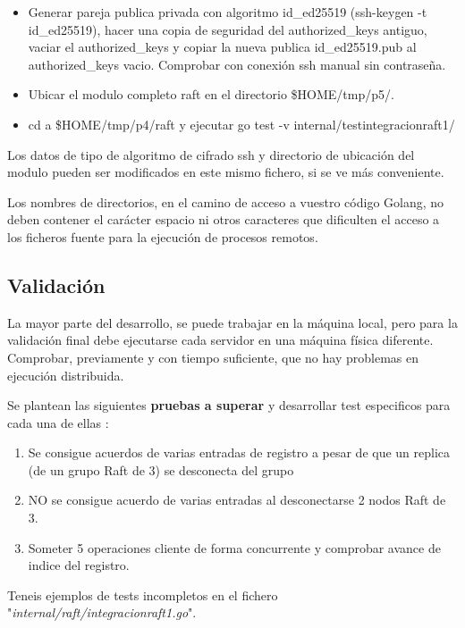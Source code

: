 \documentclass{unizarpractice}
\begin{document}
\begin{itemize}[topsep=-0.5\baselineskip]
	\item Generar pareja publica privada con algoritmo id\_ed25519 (ssh-keygen -t id\_ed25519), hacer una copia de seguridad del authorized\_keys antiguo, vaciar el authorized\_keys y copiar la nueva publica id\_ed25519.pub al authorized\_keys vacio. Comprobar con conexión ssh manual sin contraseña.
	\item Ubicar el modulo completo raft en el directorio \$HOME/tmp/p5/.
	\item cd a \$HOME/tmp/p4/raft y ejecutar go test -v internal/testintegracionraft1/	
\end{itemize}

Los datos de tipo de algoritmo de cifrado ssh y directorio de ubicación del modulo pueden ser modificados en este mismo fichero, si se ve más conveniente.

Los nombres de directorios, en el camino de acceso a vuestro código Golang, no deben contener el carácter espacio ni otros caracteres que dificulten el acceso a los ficheros fuente para la ejecución de procesos remotos.


\subsection{Validación}
La mayor parte del desarrollo, se puede trabajar en la máquina local, pero para la validación final debe ejecutarse cada servidor en una máquina física diferente. Comprobar, previamente y con tiempo suficiente, que no hay problemas en ejecución distribuida.

\noindent Se plantean las siguientes \textbf{pruebas a superar} y desarrollar test especificos para cada una de ellas :

\begin{enumerate}[topsep=-0.5\baselineskip]
\item Se consigue acuerdos de varias entradas de registro	a pesar de que un replica (de un grupo Raft de 3) se desconecta del grupo
\item NO se consigue acuerdo de varias entradas al desconectarse 2 nodos Raft de 3.	
\item Someter 5 operaciones cliente de forma concurrente y comprobar avance de indice del registro.

\end{enumerate}

Teneis ejemplos de tests incompletos en el fichero "\textit{internal/raft/integracionraft1.go}".
\end{document}
